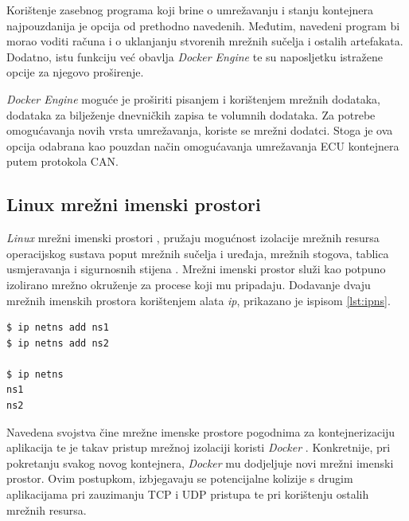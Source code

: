 \documentclass[times, utf8, diplomski, numeric]{fer}
\begin{document}
Korištenje zasebnog programa koji brine o umrežavanju i stanju kontejnera najpouzdanija je opcija od prethodno navedenih. Međutim, navedeni program bi morao voditi računa i o uklanjanju stvorenih mrežnih sučelja i ostalih artefakata. Dodatno, istu funkciju već obavlja \textit{Docker Engine} te su naposljetku istražene opcije za njegovo proširenje.

\textit{Docker Engine} moguće je proširiti pisanjem i korištenjem mrežnih dodataka, dodataka za bilježenje dnevničkih zapisa te volumnih dodataka. Za potrebe omogućavanja novih vrsta umrežavanja, koriste se mrežni dodatci. Stoga je ova opcija odabrana kao pouzdan način omogućavanja umrežavanja ECU kontejnera putem protokola CAN.  

\subsection{Linux mrežni imenski prostori}
\textit{Linux} mrežni imenski prostori , pružaju mogućnost izolacije mrežnih resursa operacijskog sustava poput mrežnih sučelja i uređaja, mrežnih stogova, tablica usmjeravanja i sigurnosnih stijena \cite{man2024namespaces}. Mrežni imenski prostor služi kao potpuno izolirano mrežno okruženje za procese koji mu pripadaju. Dodavanje dvaju mrežnih imenskih prostora korištenjem alata \textit{ip}, prikazano je ispisom \ref{lst:ipns}.
\bigskip
\begin{lstlisting}[style=terminal, label={lst:ipns},caption={Dodavanje mrežnih imenskih prostora}]
$ ip netns add ns1
$ ip netns add ns2

$ ip netns
ns1
ns2
\end{lstlisting}
Navedena svojstva čine mrežne imenske prostore pogodnima za kontejnerizaciju aplikacija te je takav pristup mrežnoj izolaciji koristi \textit{Docker} \cite{rana2023dockernetworking}. Konkretnije, pri pokretanju svakog novog kontejnera, \textit{Docker} mu dodjeljuje novi mrežni imenski prostor. Ovim postupkom, izbjegavaju se potencijalne kolizije s drugim aplikacijama pri zauzimanju TCP i UDP pristupa te pri korištenju ostalih mrežnih resursa.
\end{document}
